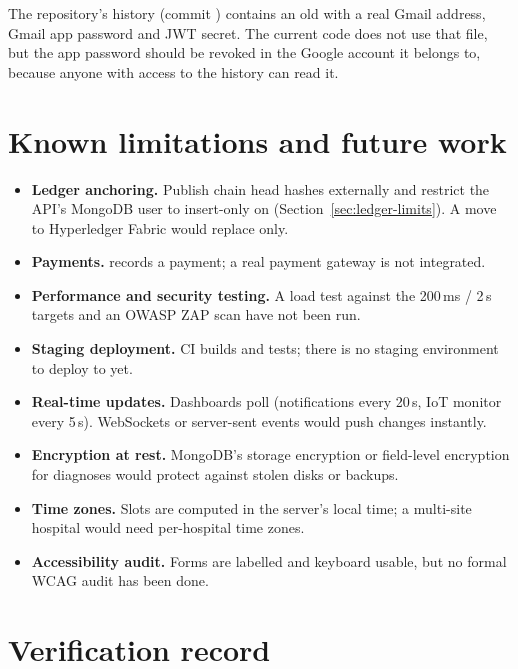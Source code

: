 \begin{warn}
The repository's history (commit ) contains an old
 with a real Gmail address, Gmail app password
and JWT secret. The current code does not use that file, but the app password
should be revoked in the Google account it belongs to, because anyone with
access to the history can read it.
\end{warn}

\section{Known limitations and future work}

\begin{itemize}
  \item \textbf{Ledger anchoring.} Publish chain head hashes externally and
    restrict the API's MongoDB user to insert-only on 
    (Section~\ref{sec:ledger-limits}). A move to Hyperledger Fabric would
    replace  only.
  \item \textbf{Payments.}  records a payment; a real
    payment gateway is not integrated.
  \item \textbf{Performance and security testing.} A load test against the
    200\,ms / 2\,s targets and an OWASP ZAP scan have not been run.
  \item \textbf{Staging deployment.} CI builds and tests; there is no staging
    environment to deploy to yet.
  \item \textbf{Real-time updates.} Dashboards poll (notifications every 20\,s,
    IoT monitor every 5\,s). WebSockets or server-sent events would push changes
    instantly.
  \item \textbf{Encryption at rest.} MongoDB's storage encryption or
    field-level encryption for diagnoses would protect against stolen disks or
    backups.
  \item \textbf{Time zones.} Slots are computed in the server's local time; a
    multi-site hospital would need per-hospital time zones.
  \item \textbf{Accessibility audit.} Forms are labelled and keyboard usable, but
    no formal WCAG audit has been done.
\end{itemize}

\section{Verification record}

